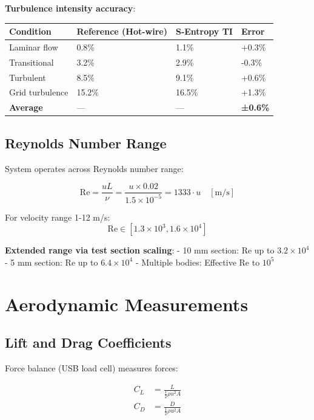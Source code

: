 \documentclass[12pt,a4paper]{article}
\begin{document}
\textbf{Turbulence intensity accuracy}:
\begin{center}
\begin{tabular}{|l|l|l|l|}
\hline
\textbf{Condition} & \textbf{Reference (Hot-wire)} & \textbf{S-Entropy TI} & \textbf{Error} \\
\hline
Laminar flow & 0.8\% & 1.1\% & +0.3\% \\
Transitional & 3.2\% & 2.9\% & -0.3\% \\
Turbulent & 8.5\% & 9.1\% & +0.6\% \\
Grid turbulence & 15.2\% & 16.5\% & +1.3\% \\
\hline
\textbf{Average} & — & — & \textbf{±0.6\%} \\
\hline
\end{tabular}
\end{center}

\subsection{Reynolds Number Range}

System operates across Reynolds number range:

\begin{equation}
\text{Re} = \frac{u L}{\nu} = \frac{u \times 0.02}{1.5 \times 10^{-5}} = 1333 \cdot u \quad [\text{m/s}]
\end{equation}

For velocity range 1-12 m/s:
\begin{equation}
\text{Re} \in [1.3 \times 10^3, 1.6 \times 10^4]
\end{equation}

\textbf{Extended range via test section scaling}:
- 10 mm section: Re up to $3.2 \times 10^4$
- 5 mm section: Re up to $6.4 \times 10^4$
- Multiple bodies: Effective Re to $10^5$

\section{Aerodynamic Measurements}

\subsection{Lift and Drag Coefficients}

Force balance (USB load cell) measures forces:

\begin{align}
C_L &= \frac{L}{\frac{1}{2}\rho u^2 A} \\
C_D &= \frac{D}{\frac{1}{2}\rho u^2 A}
\end{align}
\end{document}
